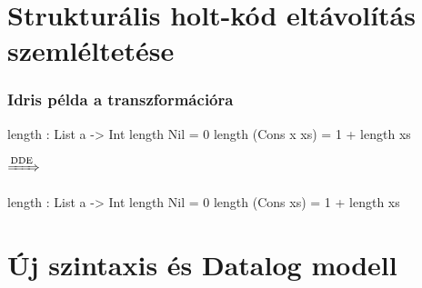 \documentclass[bigger]{beamer}
\begin{document}
\section{Strukturális holt-kód eltávolítás szemléltetése}

\begin{frame}[fragile]
	\frametitle{Idris példa a transzformációra}
	
	\begin{center}
		\begin{minipage}{0.40\textwidth}
			\begin{haskellcode}
				length : List a -> Int
				length Nil = 0
				length (Cons x xs) 
				  = 1 + length xs
			\end{haskellcode}
		\end{minipage}
		\pause
		$\xRightarrow{\text{DDE}}$
		\begin{minipage}{0.40\textwidth}
			\begin{haskellcode}
				length : List a -> Int
				length Nil = 0
				length (Cons xs) 
				  = 1 + length xs
			\end{haskellcode}
		\end{minipage}
	\end{center}
	
\end{frame}

\section{Új szintaxis és Datalog modell} 
\end{document}
